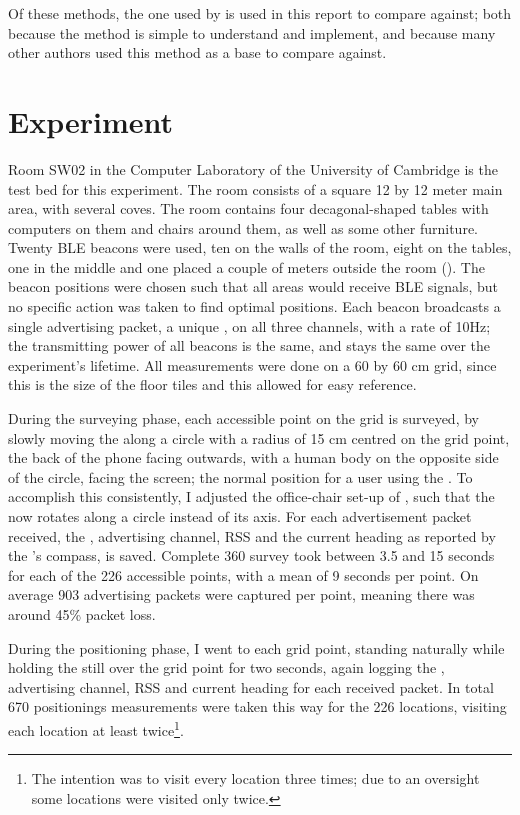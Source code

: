 Of these methods, the one used by \citep{bahl2000radar} is used in this report to compare against; both because the method is simple to understand and implement, and because many other authors used this method as a base to compare against.

\section{Experiment}
\label{sec:architecture-experiment}
Room SW02 in the Computer Laboratory of the University of Cambridge is the test bed for this experiment.
The room consists of a square 12 by 12 meter main area, with several coves.
The room contains four decagonal-shaped tables with computers on them and chairs around them, as well as some other furniture.
Twenty BLE beacons were used, ten on the walls of the room, eight on the tables, one in the middle and one placed a couple of meters outside the room ().
The beacon positions were chosen such that all areas would receive BLE signals, but no specific action was taken to find optimal positions.
Each beacon broadcasts a single advertising packet, a unique \bid, on all three channels, with a rate of 10Hz; the transmitting power of all beacons is the same, and stays the same over the experiment's lifetime.
All measurements were done on a 60 by 60 cm grid, since this is the size of the floor tiles and this allowed for easy reference.

During the surveying phase, each accessible point on the grid is surveyed, by slowly moving the \device along a circle with a radius of 15 cm centred on the grid point, the back of the phone facing outwards, with a human body on the opposite side of the circle, facing the screen; the normal position for a user using the \device.
To accomplish this consistently, I adjusted the office-chair set-up of , such that the \device now rotates along a circle instead of its axis.
For each advertisement packet received, the \bid, advertising channel, RSS and the current heading as reported by the \device's compass, is saved.
Complete 360\textdegree{} survey took between 3.5 and 15 seconds for each of the 226 accessible points, with a mean of 9 seconds per point.
On average 903 advertising packets were captured per point, meaning there was around 45\% packet loss.

During the positioning phase, I went to each grid point, standing naturally while holding the \device still over the grid point for two seconds, again logging the \bid, advertising channel, RSS and current heading for each received packet.
In total 670 positionings measurements were taken this way for the 226 locations, visiting each location at least twice\footnote{The intention was to visit every location three times; due to an oversight some locations were visited only twice.}.

